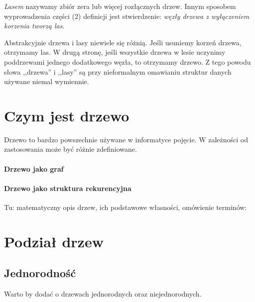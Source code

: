 \emph{Lasem} nazywamy zbiór zera lub więcej rozłącznych drzew. 
Innym sposobem wyprowadzenia części (2) definicji jest stwierdzenie: \textit{węzły drzewa z wyłączeniem korzenia tworzą las}.

Abstrakcyjnie drzewa i lasy niewiele się różnią.
Jeśli usuniemy korzeń drzewa, otrzymamy las.
W drugą stronę, jeśli wszystkie drzewa w lesie uczynimy poddrzewami jednego dodatkowego węzła,
to otrzymamy drzewo.
Z tego powodu słowa ,,drzewa'' i ,,lasy'' są przy nieformalnym omawianiu struktur danych używane niemal wymiennie.



\section{Czym jest drzewo}
Drzewo to bardzo powszechnie używane w informatyce pojęcie. W zależności od zastosowania może być różnie zdefiniowane.

\paragraph{Drzewo jako graf}
\paragraph{Drzewo jako struktura rekurencyjna}


Tu: matematyczny opis drzew, ich podstawowe własności, omówienie terminów:
\begin{description}
    \item
    \item[drzewo]
    \item[las]
    \item[rodzic]
    \item[przodek]
    \item[korzeń]
    \item[dziecko]
    \item[potomek]
    \item[głębokość, mini]
\end{description}

\section{Podział drzew}
\subsection{Jednorodność}
Warto by dodać o drzewach jednorodnych oraz niejednorodnych.

